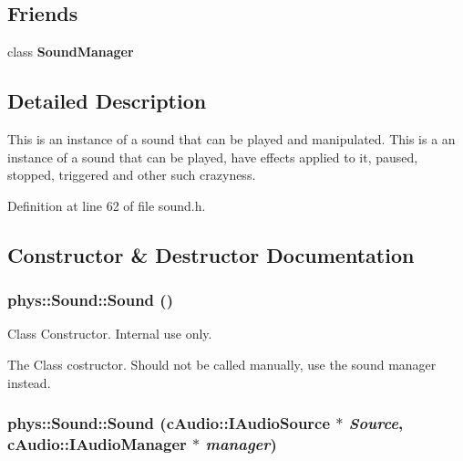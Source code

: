 \subsection*{Friends}
\begin{DoxyCompactItemize}
\item 
\hypertarget{classphys_1_1Sound_aee940642f2974e262db9284c0b1d9766}{
class {\bfseries SoundManager}}
\label{dc/d2f/classphys_1_1Sound_aee940642f2974e262db9284c0b1d9766}

\end{DoxyCompactItemize}


\subsection{Detailed Description}
This is an instance of a sound that can be played and manipulated. This is a an instance of a sound that can be played, have effects applied to it, paused, stopped, triggered and other such crazyness. 

Definition at line 62 of file sound.h.



\subsection{Constructor \& Destructor Documentation}
\hypertarget{classphys_1_1Sound_a6a9d4b475da9453c9b02ca2c49a6fa76}{
\subsubsection[{Sound}]{\setlength{\rightskip}{0pt plus 5cm}phys::Sound::Sound ()}}
\label{dc/d2f/classphys_1_1Sound_a6a9d4b475da9453c9b02ca2c49a6fa76}


Class Constructor. Internal use only. 

The Class costructor. Should not be called manually, use the sound manager instead. \hypertarget{classphys_1_1Sound_a0452d6079bcb201f9d2f3b2742eb21b6}{
\subsubsection[{Sound}]{\setlength{\rightskip}{0pt plus 5cm}phys::Sound::Sound (cAudio::IAudioSource $\ast$ {\em Source}, \/  cAudio::IAudioManager $\ast$ {\em manager})}}
\label{dc/d2f/classphys_1_1Sound_a0452d6079bcb201f9d2f3b2742eb21b6}


